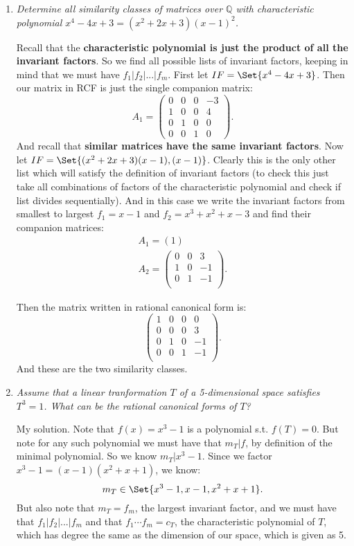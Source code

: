 \documentclass[9pt,reqno,twoside]{amsbook}
\theoremstyle{plain}
\numberwithin{section}{chapter}
\numberwithin{equation}{chapter}
\theoremstyle{definition}
\theoremstyle{remark}
\theoremstyle{plain}
\newcommand{\Q}{\mathbb{Q}}
\newcommand{\bb}{\vspace{3mm}}
\newcommand{\bee}{\begin{equation}\begin{aligned}}
\newcommand{\eee}{\end{aligned}\end{equation}}
\newcommand{\lpar}{\left(}
\newcommand{\rpar}{\right)}
\begin{document}
\begin{enumerate}[label=\arabic*.]
\item \textit{Determine all similarity classes of matrices over $\Q$ with characteristic polynomial $x^4 - 4x + 3 = (x^2 + 2x + 3)(x - 1)^2$. }


Recall that the \textbf{characteristic polynomial is just the product of all the invariant factors}. So we find all possible lists of invariant factors, keeping in mind that we must have $f_1|f_2|...|f_m$. First let $IF = \Set{x^4 - 4x + 3}$. Then our matrix in RCF is just the single companion matrix:
$$
A_1
= \lpar 
\begin{array}{ccc|c}
0 & 0 & 0 & -3\\
1 & 0 & 0 & 4\\
0 & 1 & 0 & 0\\
0 & 0 & 1 & 0
\end{array} \rpar. 
$$
And recall that \textbf{similar matrices have the same invariant factors}. Now let $IF = \Set{(x^2 + 2x + 3)(x - 1),(x - 1)}$. Clearly this is the only other list which will satisfy the definition of invariant factors (to check this just take all combinations of factors of the characteristic polynomial and check if list divides sequentially). And in this case we write the invariant factors from smallest to largest $f_1 = x - 1$ and $f_2 = x^3 + x^2 + x - 3$ and find their companion matrices: 
\bee
A_1 = (1)\\
A_2 = \lpar 
\begin{matrix}
0 & 0 & 3\\
1 & 0 & -1\\
0 & 1 & -1\\
\end{matrix} \rpar.
\eee

Then the matrix written in rational canonical form is:
$$
\lpar 
\begin{matrix}
1 & 0 & 0 & 0\\
0 & 0 & 0 & 3\\
0 & 1 & 0 & -1\\
0 & 0 & 1 & -1\\
\end{matrix} \rpar. 
$$
And these are the two similarity classes. 


\setcounter{enumi}{15}

\item \textit{Assume that a linear tranformation $T$ of a 5-dimensional space satisfies $T^3 = 1$. What can be the rational canonical forms of $T$?}
\bb


My solution. Note that $f(x) = x^3 - 1$ is a polynomial s.t. $f(T) = 0$. But note for any such polynomial we must have that $m_T|f$, by definition of the minimal polynomial. So we know $m_T|x^3 - 1$. Since we factor $x^3 - 1 = (x - 1)(x^2 + x + 1)$, we know:
$$
m_T \in \Set{x^3 - 1,x - 1,x^2 + x  +1}.
$$
But also note that $m_T = f_m$, the largest invariant factor, and we must have that $f_1|f_2|...|f_m$ and that $f_1\cdots f_m = c_T$, the characteristic polynomial of $T$, which has degree the same as the dimension of our space, which is given as 5. 


\end{enumerate}
\end{document}
